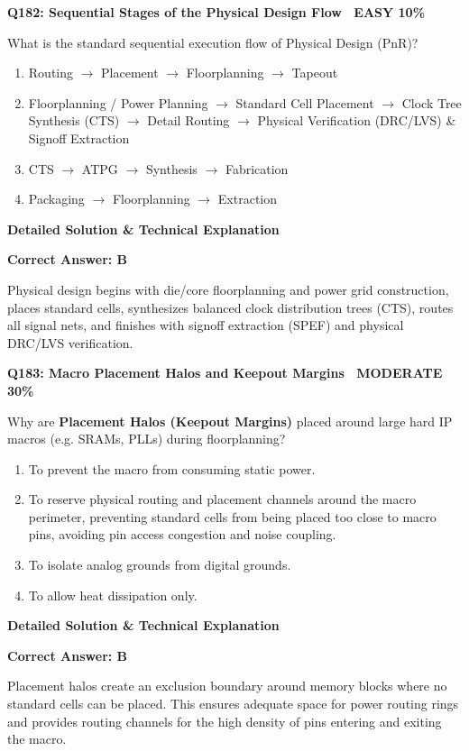 \documentclass[11pt,a4paper]{article}
\newcommand{\badgemod}{{\color{white}\colorbox{modoran}{\bfseries\sffamily\tiny\ MODERATE 30\%\ }}}
\newcommand{\badgeeasy}{{\color{white}\colorbox{easygreen}{\bfseries\sffamily\tiny\ EASY 10\%\ }}}
\newenvironment{qbox}[2]{%
  \begin{mdframed}[style=qstyle]%
  {\bfseries\sffamily\color{primaryblue}#1 \hfill #2}\par\vspace{2pt}%
}{%
  \end{mdframed}%
}
\newenvironment{ansbox}{%
  \begin{mdframed}[style=ansstyle]%
  {\bfseries\sffamily\color{ansgreen}\small Detailed Solution \& Technical Explanation}\par\vspace{2pt}\small%
}{%
  \end{mdframed}%
}
\begin{document}
\begin{qbox}{Q182: Sequential Stages of the Physical Design Flow}{\badgeeasy}
What is the standard sequential execution flow of Physical Design (PnR)?
\begin{enumerate}[label=\textbf{\Alph*.}]
  \item Routing $\rightarrow$ Placement $\rightarrow$ Floorplanning $\rightarrow$ Tapeout
  \item Floorplanning / Power Planning $\rightarrow$ Standard Cell Placement $\rightarrow$ Clock Tree Synthesis (CTS) $\rightarrow$ Detail Routing $\rightarrow$ Physical Verification (DRC/LVS) \& Signoff Extraction
  \item CTS $\rightarrow$ ATPG $\rightarrow$ Synthesis $\rightarrow$ Fabrication
  \item Packaging $\rightarrow$ Floorplanning $\rightarrow$ Extraction
\end{enumerate}
\end{qbox}
\begin{ansbox}
\textbf{Correct Answer: B}

Physical design begins with die/core floorplanning and power grid construction, places standard cells, synthesizes balanced clock distribution trees (CTS), routes all signal nets, and finishes with signoff extraction (SPEF) and physical DRC/LVS verification.
\end{ansbox}

\begin{qbox}{Q183: Macro Placement Halos and Keepout Margins}{\badgemod}
Why are \textbf{Placement Halos (Keepout Margins)} placed around large hard IP macros (e.g. SRAMs, PLLs) during floorplanning?
\begin{enumerate}[label=\textbf{\Alph*.}]
  \item To prevent the macro from consuming static power.
  \item To reserve physical routing and placement channels around the macro perimeter, preventing standard cells from being placed too close to macro pins, avoiding pin access congestion and noise coupling.
  \item To isolate analog grounds from digital grounds.
  \item To allow heat dissipation only.
\end{enumerate}
\end{qbox}
\begin{ansbox}
\textbf{Correct Answer: B}

Placement halos create an exclusion boundary around memory blocks where no standard cells can be placed. This ensures adequate space for power routing rings and provides routing channels for the high density of pins entering and exiting the macro.
\end{ansbox}
\end{document}
